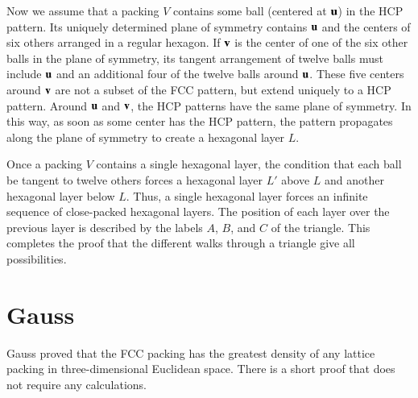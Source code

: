 Now we assume that a packing $V$ contains some ball (centered at ${\mathbf u}$)
in the HCP pattern. Its uniquely determined
plane of symmetry contains ${\mathbf u}$ and the centers of six
others arranged in a regular hexagon. If ${\mathbf v}$ is the center of one of
the six other balls in the plane of symmetry, its  tangent arrangement
of twelve balls must include ${\mathbf u}$ and an additional four of the
twelve balls around ${\mathbf u}$. These five centers around ${\mathbf v}$ are not a
subset of the FCC pattern, but  extend uniquely to
a HCP pattern.   Around ${\mathbf u}$ and ${\mathbf v}$, the HCP patterns  have the same
plane of symmetry. In this way, as
soon as some center has the HCP pattern, the pattern
propagates along the plane of symmetry to create a hexagonal layer
$L$.

Once a packing $V$ contains a single hexagonal layer, the condition
that each ball be tangent to twelve others forces a hexagonal layer
$L'$ above $L$ and another hexagonal layer below $L$.  Thus, a single
hexagonal layer forces an infinite sequence of close-packed hexagonal
layers.  The position of each layer over the previous layer is described 
by the labels $A$, $B$, and $C$ of the triangle.
This completes the proof that the different walks through a triangle give
all possibilities.



\section{Gauss}

Gauss proved that the FCC packing has the greatest density
of any lattice packing in three-dimensional Euclidean space.  There is a
short proof that does not require any calculations.

